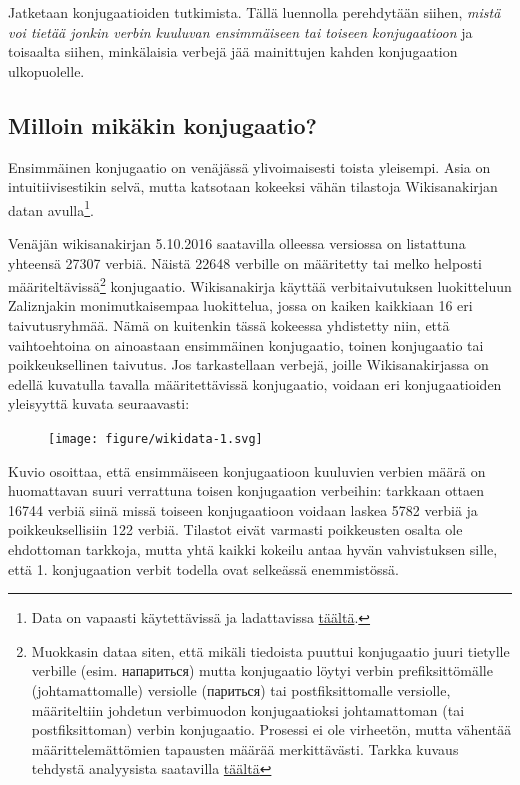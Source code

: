 \documentclass[]{scrartcl}
\begin{document}
Jatketaan konjugaatioiden tutkimista. Tällä luennolla perehdytään
siihen, \emph{mistä voi tietää jonkin verbin kuuluvan ensimmäiseen tai
toiseen konjugaatioon} ja toisaalta siihen, minkälaisia verbejä jää
mainittujen kahden konjugaation ulkopuolelle.

\subsection{Milloin mikäkin
konjugaatio?}\label{milloin-mikuxe4kin-konjugaatio}

Ensimmäinen konjugaatio on venäjässä ylivoimaisesti toista yleisempi.
Asia on intuitiivisestikin selvä, mutta katsotaan kokeeksi vähän
tilastoja Wikisanakirjan datan avulla\footnote{Data on vapaasti
  käytettävissä ja ladattavissa
  \href{https://dumps.wikimedia.org/ruwiktionary}{täältä}.}.

Venäjän wikisanakirjan 5.10.2016 saatavilla olleessa versiossa on
listattuna\\
yhteensä 27307 verbiä. Näistä 22648 verbille on määritetty tai melko
helposti määriteltävissä\footnote{Muokkasin dataa siten, että mikäli
  tiedoista puuttui konjugaatio juuri tietylle verbille (esim.
  напариться) mutta konjugaatio löytyi verbin prefiksittömälle
  (johtamattomalle) versiolle (париться) tai postfiksittomalle
  versiolle, määriteltiin johdetun verbimuodon konjugaatioksi
  johtamattoman (tai postfiksittoman) verbin konjugaatio. Prosessi ei
  ole virheetön, mutta vähentää määrittelemättömien tapausten määrää
  merkittävästi. Tarkka kuvaus tehdystä analyysista saatavilla
  \href{https://github.com/hrmJ/morfologia/blob/master/wikianalysis.Rmd}{täältä}}
konjugaatio. Wikisanakirja käyttää verbitaivutuksen luokitteluun
Zaliznjakin monimutkaisempaa luokittelua, jossa on kaiken kaikkiaan 16
eri taivutusryhmää. Nämä on kuitenkin tässä kokeessa yhdistetty niin,
että vaihtoehtoina on ainoastaan ensimmäinen konjugaatio, toinen
konjugaatio tai poikkeuksellinen taivutus. Jos tarkastellaan verbejä,
joille Wikisanakirjassa on edellä kuvatulla tavalla määritettävissä
konjugaatio, voidaan eri konjugaatioiden yleisyyttä kuvata seuraavasti:

\begin{figure}[htbp]
\centering
\texttt{[image: figure/wikidata-1.svg]}
\caption{}
\end{figure}

Kuvio osoittaa, että ensimmäiseen konjugaatioon kuuluvien verbien määrä
on huomattavan suuri verrattuna toisen konjugaation verbeihin: tarkkaan
ottaen 16744 verbiä siinä missä toiseen konjugaatioon voidaan laskea
5782 verbiä ja poikkeuksellisiin 122 verbiä. Tilastot eivät varmasti
poikkeusten osalta ole ehdottoman tarkkoja, mutta yhtä kaikki kokeilu
antaa hyvän vahvistuksen sille, että 1. konjugaation verbit todella ovat
selkeässä enemmistössä.
\end{document}
